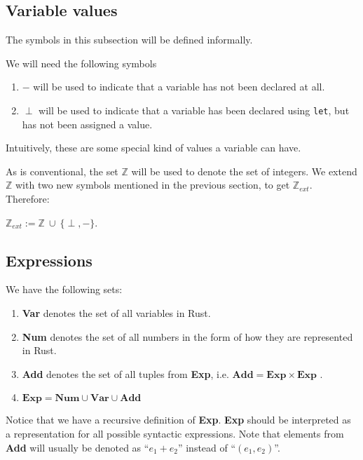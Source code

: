 \subsection*{Variable values}
The symbols in this subsection will be defined informally.  

\begin{infdefinition}
We will need the following symbols 
\begin{enumerate}[noitemsep, label={\roman*)}]
    \item $-$ will be used to indicate that a variable has not been declared at all.
    \item $\perp$ will be used to indicate that a variable has been declared using \verb|let|, but has not been assigned a value.
\end{enumerate}
\end{infdefinition}

Intuitively, these are some special kind of values a variable can have. 

As is conventional, the set $\mathbb{Z}$ will be used to denote the set of integers. We extend $\mathbb{Z}$ with two new symbols mentioned in the previous section, to get $\mathbb{Z}_{ext}$. Therefore: 

\begin{definition}
$\mathbb{Z}_{ext} := \mathbb{Z} ~\cup ~ \{\perp, -\}$.
\end{definition}

\subsection*{Expressions}
\begin{definition}
We have the following sets:
\begin{enumerate}[noitemsep, label={\roman*)}]
    \item \textbf{Var} denotes the set of all variables in Rust.
    \item \textbf{Num} denotes the set of all numbers in the form of how they are represented in Rust.
    \item \textbf{Add} denotes the set of all tuples from \textbf{Exp}, i.e. $\textbf{Add} = \textbf{Exp} \times \textbf{Exp}$ . 
    \item $\textbf{Exp} = \textbf{Num} \cup \textbf{Var} \cup \textbf{Add}$
\end{enumerate}
\end{definition}

Notice that we have a recursive definition of \textbf{Exp}. \textbf{Exp} should be interpreted as a representation for all possible syntactic expressions. Note that elements from \textbf{Add} will usually be denoted as ``$e_1 + e_2$'' instead of ``$(e_1, e_2)$''.

